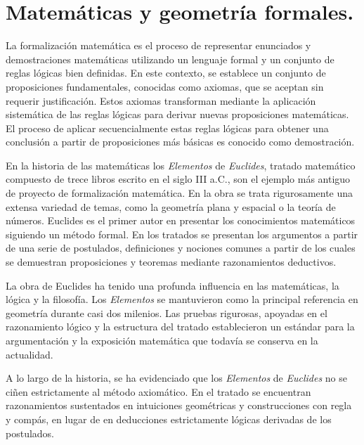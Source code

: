 \section{Matemáticas y geometría formales.}

La formalización matemática es el proceso de representar enunciados y
demostraciones matemáticas utilizando un lenguaje formal y un conjunto de reglas
lógicas bien definidas. En este contexto, se establece un conjunto de
proposiciones fundamentales, conocidas como axiomas, que se aceptan sin requerir
justificación. Estos axiomas transforman mediante la aplicación sistemática de
las reglas lógicas para derivar nuevas proposiciones matemáticas. El proceso de
aplicar secuencialmente estas reglas lógicas para obtener una conclusión a
partir de proposiciones más básicas es conocido como demostración.


En la historia de las matemáticas los \textit{Elementos} de \textit{Euclides},
tratado matemático compuesto de trece libros escrito en el siglo III a.C., son
el ejemplo más antiguo de proyecto de formalización matemática. En la obra se
trata rigurosamente una extensa variedad de temas, como la geometría plana y
espacial o la teoría de números. Euclides es el primer autor en presentar los
conocimientos matemáticos siguiendo un método formal. En los tratados se
presentan los argumentos a partir de una serie de postulados, definiciones y
nociones comunes a partir de los cuales se demuestran proposiciones y teoremas
mediante razonamientos deductivos.

La obra de Euclides ha tenido una profunda influencia en las matemáticas, la
lógica y la filosofía. Los \textit{Elementos} se mantuvieron como la principal
referencia en geometría durante casi dos milenios. Las pruebas rigurosas,
apoyadas en el razonamiento lógico y la estructura del tratado establecieron un
estándar para la argumentación y la exposición matemática que todavía se
conserva en la actualidad.

A lo largo de la historia, se ha evidenciado que los \textit{Elementos} de
\textit{Euclides} no se ciñen estrictamente al método axiomático. En el tratado
se encuentran razonamientos sustentados en intuiciones geométricas y
construcciones con regla y compás, en lugar de en deducciones estrictamente
lógicas derivadas de los postulados.


